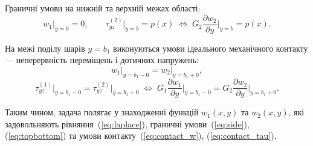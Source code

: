 Граничні умови на нижній та верхній межах області:
\begin{equation}
	w_1\Big|_{y=0} = 0, \qquad
	\tau_{yz}^{(2)}\Big|_{y=b} = p(x) \;\Longleftrightarrow\; G_2 \frac{\partial w_2}{\partial y}\Big|_{y=b} = p(x).
	\label{eq:topbottom}
\end{equation}

На межі поділу шарів $y = b_1$ виконуються умови ідеального механічного контакту — неперервність переміщень і дотичних напружень:
\begin{equation}
	w_1\Big|_{y=b_1-0} = w_2\Big|_{y=b_1+0},
	\label{eq:contact_w}
\end{equation}
\begin{equation}
	\tau_{yz}^{(1)}\Big|_{y=b_1-0} = \tau_{yz}^{(2)}\Big|_{y=b_1+0}
	\;\Longleftrightarrow\;
	G_1 \frac{\partial w_1}{\partial y}\Big|_{y=b_1-0} = G_2 \frac{\partial w_2}{\partial y}\Big|_{y=b_1+0}.
	\label{eq:contact_tau}
\end{equation}

Таким чином, задача полягає у знаходженні функцій $w_1(x,y)$ та $w_2(x,y)$, які задовольняють рівняння~(\ref{eq:laplace}), граничні умови~(\ref{eq:side}), (\ref{eq:topbottom}) та умови контакту~(\ref{eq:contact_w}), (\ref{eq:contact_tau}).
